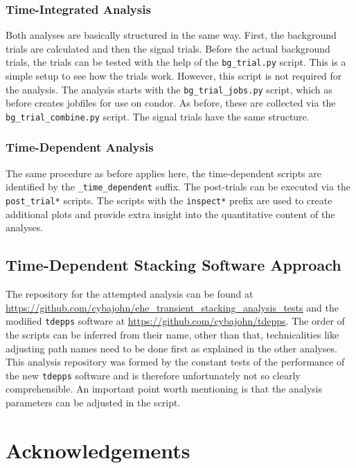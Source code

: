 \subsection{Time-Integrated Analysis}

Both analyses are basically structured in the same way.
First, the background trials are calculated and then the signal trials.
Before the actual background trials, the trials can be tested with the help of the \texttt{bg\_trial.py} script.
This is a simple setup to see how the trials work.
However, this script is not required for the analysis.
The analysis starts with the \texttt{bg\_trial\_jobs.py} script, which as before creates jobfiles for use on condor.
As before, these are collected via the \texttt{bg\_trial\_combine.py} script.
The signal trials have the same structure.

\subsection{Time-Dependent Analysis}

The same procedure as before applies here, the time-dependent scripts are identified by the \texttt{\_time\_dependent} suffix.
The post-trials can be executed via the \texttt{post\_trial*} scripts.
The scripts with the \texttt{inspect*} prefix are used to create additional plots and provide extra insight into the quantitative content of the analyses.

\section{Time-Dependent Stacking Software Approach}

The repository for the attempted analysis can be found at \url{https://github.com/cybajohn/ehe_transient_stacking_analysis_tests} and the modified \texttt{tdepps} software at \url{https://github.com/cybajohn/tdepps}.
The order of the scripts can be inferred from their name, other than that, technicalities like adjusting path names need to be done first as explained in the other analyses.
This analysis repository was formed by the constant tests of the performance of the new \texttt{tdepps} software and is therefore unfortunately not so clearly comprehensible.
An important point worth mentioning is that the analysis parameters can be adjusted in the script.

\chapter{Acknowledgements}

